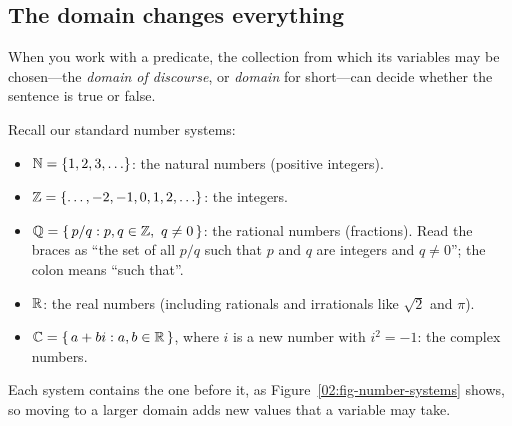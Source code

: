 \subsection{The domain changes everything}

When you work with a predicate, the collection from which its variables may be chosen---the \emph{domain of discourse}, or \emph{domain} for short---can decide whether the sentence is true or false.

Recall our standard number systems:
\begin{itemize}
\item $\mathbb{N} = \{1, 2, 3, \ldots\}$: the natural numbers (positive integers).
\item $\mathbb{Z} = \{\ldots, -2, -1, 0, 1, 2, \ldots\}$: the integers.
\item $\mathbb{Q} = \{\, p/q : p, q \in \mathbb{Z},\ q \neq 0 \,\}$: the rational numbers (fractions). Read the braces as ``the set of all $p/q$ such that $p$ and $q$ are integers and $q \neq 0$''; the colon means ``such that''.
\item $\mathbb{R}$: the real numbers (including rationals and irrationals like $\sqrt{2}$ and $\pi$).
\item $\mathbb{C} = \{\, a + bi : a, b \in \mathbb{R} \,\}$, where $i$ is a new number with $i^2 = -1$: the complex numbers.
\end{itemize}
Each system contains the one before it, as Figure~\ref{02:fig-number-systems} shows, so moving to a larger domain adds new values that a variable may take.

